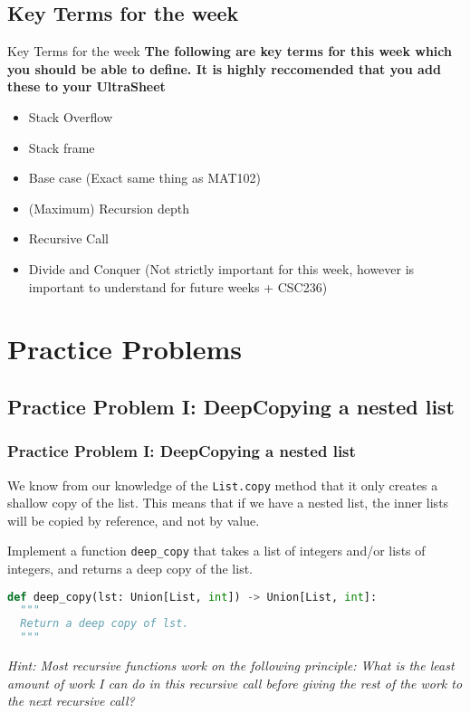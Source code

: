 \documentclass[hyperref={colorlinks,citecolor=blue,linkcolor=blue,urlcolor=blue}]{beamer}
\begin{document}
\subsection{Key Terms for the week}

\begin{frame}{Key Terms for the week}
  \textbf<overlay specification>{The following are key terms for this week which you should be able to define. It is highly reccomended that you add these to your UltraSheet\texttrademark{}}

  \begin{itemize}
  \item Stack Overflow
  \item Stack frame
  \item Base case (Exact same thing as MAT102)
  \item (Maximum) Recursion depth
  \item Recursive Call
  \item Divide and Conquer (Not strictly important for this week, however is important to understand for future weeks + CSC236)
  \end{itemize}
\end{frame}

\section{Practice Problems}
\subsection{Practice Problem I: DeepCopying a nested list}
\begin{frame}[fragile]
  \frametitle{Practice Problem I: DeepCopying a nested list}
  We know from our knowledge of the \texttt{List.copy} method that it only creates a shallow copy of the list. This means that if we have a nested list, the inner lists will be copied by reference, and not by value.

  Implement a function \texttt{deep\_copy} that takes a list of integers and/or lists of integers, and returns a deep copy of the list.
  \begin{lstlisting}[language=Python, caption=Method signature of the deep\_copy method, style=mystyle]
def deep_copy(lst: Union[List, int]) -> Union[List, int]:
  """
  Return a deep copy of lst.
  """

  \end{lstlisting}

  \textit{Hint: Most recursive functions work on the following principle: What is the least amount of work I can do in this recursive call before giving the rest of the work to the next recursive call?}

\end{frame}
\end{document}
